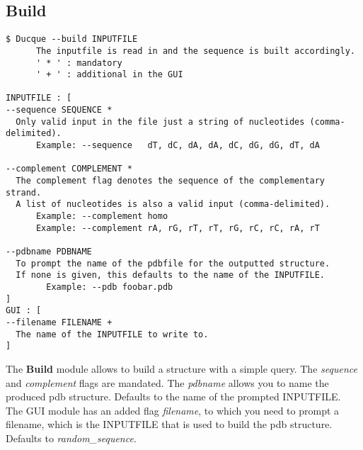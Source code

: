 \subsection{Build}

\begin{verbatim}
$ Ducque --build INPUTFILE
      The inputfile is read in and the sequence is built accordingly.
      ' * ' : mandatory
      ' + ' : additional in the GUI

INPUTFILE : [
--sequence SEQUENCE *
  Only valid input in the file just a string of nucleotides (comma-delimited).
      Example: --sequence   dT, dC, dA, dA, dC, dG, dG, dT, dA

--complement COMPLEMENT *
  The complement flag denotes the sequence of the complementary strand.
  A list of nucleotides is also a valid input (comma-delimited).
      Example: --complement homo
      Example: --complement rA, rG, rT, rT, rG, rC, rC, rA, rT

--pdbname PDBNAME
  To prompt the name of the pdbfile for the outputted structure.
  If none is given, this defaults to the name of the INPUTFILE.
        Example: --pdb foobar.pdb
]
GUI : [
--filename FILENAME + 
  The name of the INPUTFILE to write to.
]
\end{verbatim}
%
The \textbf{Build} module allows to build a structure with a simple query. The \emph{sequence} and \emph{complement} flags are mandated. The \emph{pdbname} allows you to name the produced pdb structure. Defaults to the name of the prompted INPUTFILE. \\ 
The GUI module has an added flag \emph{filename}, to which you need to prompt a filename, which is the INPUTFILE that is used to build the pdb structure. Defaults to \textit{random\_sequence}.
\pagebreak
